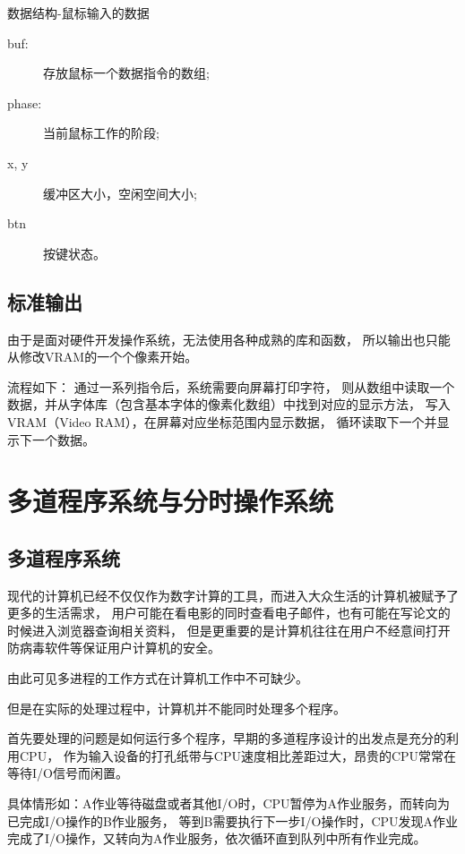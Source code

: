 \begin{listing}[H]
  \inputminted[tabsize=2, firstline=126, lastline=129,
  linenos=true]{c}{../ZOS/src/kernel/bootpack.h}
  \caption{数据结构-鼠标输入的数据}
  \label{lst:mouse_data}
\end{listing}
\begin{description}
\item[buf:]存放鼠标一个数据指令的数组;
\item[phase:]当前鼠标工作的阶段;
\item[x, y]缓冲区大小，空闲空间大小;
\item[btn]按键状态。
\end{description}


\subsection{标准输出}

由于是面对硬件开发操作系统，无法使用各种成熟的库和函数，
所以输出也只能从修改VRAM的一个个像素开始。

流程如下：
通过一系列指令后，系统需要向屏幕打印字符，
则从数组中读取一个数据，并从字体库（包含基本字体的像素化数组）中找到对应的显示方法，
写入VRAM（Video RAM），在屏幕对应坐标范围内显示数据，
循环读取下一个并显示下一个数据。

\section{多道程序系统与分时操作系统}

\subsection{多道程序系统}

现代的计算机已经不仅仅作为数字计算的工具，而进入大众生活的计算机被赋予了更多的生活需求，
用户可能在看电影的同时查看电子邮件，也有可能在写论文的时候进入浏览器查询相关资料，
但是更重要的是计算机往往在用户不经意间打开防病毒软件等保证用户计算机的安全。

由此可见多进程的工作方式在计算机工作中不可缺少。

但是在实际的处理过程中，计算机并不能同时处理多个程序。

首先要处理的问题是如何运行多个程序，早期的多道程序设计的出发点是充分的利用CPU，
作为输入设备的打孔纸带与CPU速度相比差距过大，昂贵的CPU常常在等待I/O信号而闲置。

具体情形如：A作业等待磁盘或者其他I/O时，CPU暂停为A作业服务，而转向为已完成I/O操作的B作业服务，
等到B需要执行下一步I/O操作时，CPU发现A作业完成了I/O操作，又转向为A作业服务，依次循环直到队列中所有作业完成。

